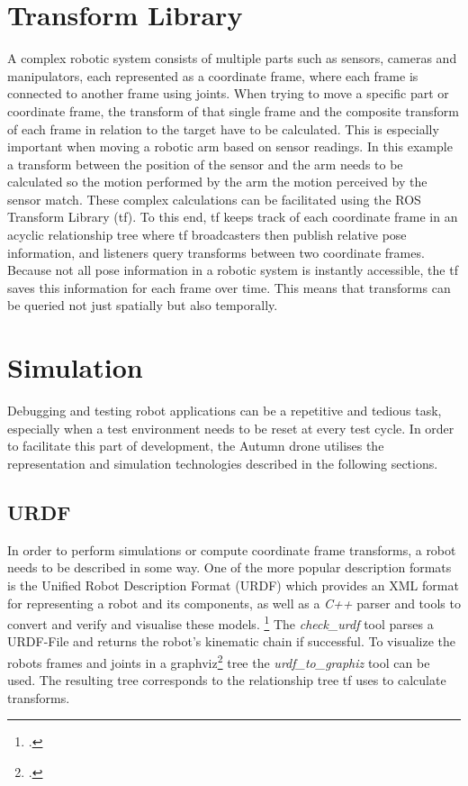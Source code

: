 \section{Transform Library}
A complex robotic system consists of multiple parts such as sensors, cameras and manipulators, each represented as a coordinate frame, where each frame is connected to another frame using joints. When trying to move a specific part or coordinate frame, the transform of that single frame and the composite transform of each frame in relation to the target have to be calculated. This is especially important when moving a robotic arm based on sensor readings. In this example a transform between the position of the sensor and the arm needs to be calculated so the motion performed by the arm the motion perceived by the sensor match.
These complex calculations can be facilitated using the ROS Transform Library (tf). To this end, tf keeps track of each coordinate frame in an acyclic relationship tree where tf broadcasters then publish relative pose information, and listeners query transforms between two coordinate frames. 
Because not all pose information in a robotic system is instantly accessible, the tf saves this information for each frame over time. This means that transforms can be queried not just spatially but also temporally.



\section{Simulation}
Debugging and testing robot applications can be a repetitive and tedious task, especially when a test environment needs to be reset at every test cycle. In order to facilitate this part of development, the Autumn drone utilises the representation and simulation technologies described in the following sections.

\subsection{URDF}
In order to perform simulations or compute coordinate frame transforms, a robot needs to be described in some way. One of the more popular description formats is the Unified Robot Description Format (URDF) which provides an XML format for representing a robot and its components, as well as a \textit{C++} parser and tools to convert and verify and visualise these models. \footcite{openSourceRoboticsFoundationURDFNodate}
The \textit{check\_urdf} tool parses a URDF-File and returns the robot's kinematic chain if successful.
To visualize the robots frames and joints in a graphviz\footcite{graphvizAuthorsAboutNodate} tree the \textit{urdf\_to\_graphiz} tool can be used. The resulting tree corresponds to the relationship tree tf uses to calculate transforms.

